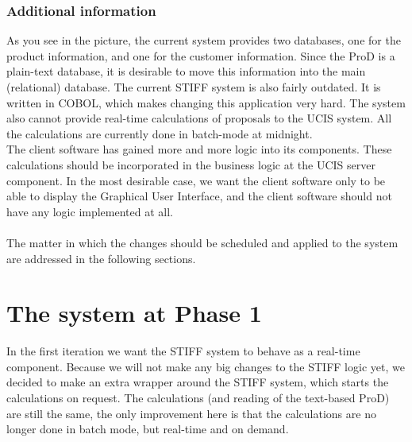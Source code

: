 \subsubsection{Additional information}
As you see in the picture, the current system provides two databases, one for the product
information, and one for the customer information. Since the ProD is a plain-text database,
it is desirable to move this information into the main (relational) database. The current 
STIFF system is also fairly outdated. It is written in COBOL, which makes changing this
application very hard. The system also cannot provide real-time calculations of proposals
to the UCIS system. All the calculations are currently done in batch-mode at midnight.\\
The client software has gained more and more logic into its components. These calculations
should be incorporated in the business logic at the UCIS server component. In the most 
desirable case, we want the client software only to be able to display the Graphical User 
Interface, and the client software should not have any logic implemented at all.\\
 \\
The matter in which the changes should be scheduled and applied to the system are addressed
in the following sections.



\section{The system at Phase 1}
In the first iteration we want the STIFF system to behave as a real-time component. 
Because we will not make any big changes to the STIFF logic yet, we decided to make an extra
wrapper around the STIFF system, which starts the calculations on request. The calculations
(and reading of the text-based ProD) are still the same, the only improvement here is that
the calculations are no longer done in batch mode, but real-time and on demand.


